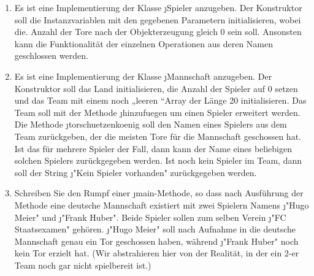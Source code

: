 \documentclass{bschlangaul-aufgabe}
\begin{document}
\begin{enumerate}


\item Es ist eine Implementierung der Klasse \j{Spieler} anzugeben.
Der Konstruktor soll die Instanzvariablen mit den gegebenen Parametern
initialisieren, wobei die. Anzahl der Tore nach der Objekterzeugung
gleich 0 sein soll. Ansonsten kann die Funktionalität der einzelnen
Operationen aus deren Namen geschlossen werden.

\begin{bAntwort}
\end{bAntwort}


\item Es ist eine Implementierung der Klasse \j{Mannschaft}
anzugeben. Der Konstruktor soll das Land initialisieren, die Anzahl der
Spieler auf 0 setzen und das Team mit einem noch „leeren
“Array der Länge 20 initialisieren. Das Team soll
mit der Methode \j{hinzufuegen} um einen Spieler erweitert
werden. Die Methode \j{torschuetzenkoenig} soll den Namen eines
Spielers aus dem Team zurückgeben, der die meisten Tore für die
Mannschaft geschossen hat. Ist das für mehrere Spieler der Fall, dann
kann der Name eines beliebigen solchen Spielers zurückgegeben werden.
Ist noch kein Spieler im Team, dann soll der String \j{"Kein
Spieler vorhanden"} zurückgegeben werden.

\begin{bAntwort}
\end{bAntwort}


\item Schreiben Sie den Rumpf einer
\j{main}-Methode, so dass nach Ausführung
der Methode eine deutsche Mannschaft existiert mit zwei Spielern Namens
\j{"Hugo Meier"} und \j{"Frank Huber"}. Beide Spieler
sollen zum selben Verein \j{"FC Staatsexamen"} gehören.
\j{"Hugo Meier"} soll nach Aufnahme in die deutsche Mannschaft
genau ein Tor geschossen haben, während \j{"Frank Huber"} noch
kein Tor erzielt hat. (Wir abstrahieren hier von der Realität, in der
ein 2-er Team noch gar nicht spielbereit ist.)

\begin{bAntwort}
\end{bAntwort}
\end{enumerate}
\end{document}
